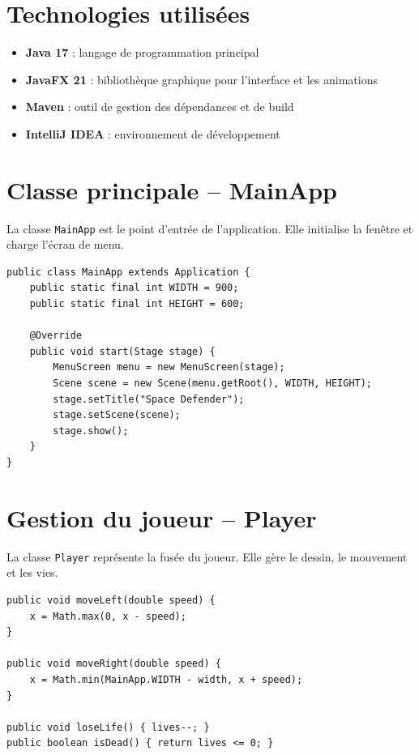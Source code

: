 \documentclass[12pt,a4paper]{report}
\begin{document}
\section{Technologies utilisées}
\begin{itemize}[leftmargin=1.5cm]
  \item \textbf{Java 17} : langage de programmation principal
  \item \textbf{JavaFX 21} : bibliothèque graphique pour l'interface et les animations
  \item \textbf{Maven} : outil de gestion des dépendances et de build
  \item \textbf{IntelliJ IDEA} : environnement de développement
\end{itemize}

\section{Classe principale -- MainApp}
La classe \texttt{MainApp} est le point d'entrée de l'application. Elle initialise la fenêtre et charge l'écran de menu.

\begin{lstlisting}[caption={MainApp.java -- Point d'entrée}]
public class MainApp extends Application {
    public static final int WIDTH = 900;
    public static final int HEIGHT = 600;

    @Override
    public void start(Stage stage) {
        MenuScreen menu = new MenuScreen(stage);
        Scene scene = new Scene(menu.getRoot(), WIDTH, HEIGHT);
        stage.setTitle("Space Defender");
        stage.setScene(scene);
        stage.show();
    }
}
\end{lstlisting}

\section{Gestion du joueur -- Player}
La classe \texttt{Player} représente la fusée du joueur. Elle gère le dessin, le mouvement et les vies.

\begin{lstlisting}[caption={Player.java -- Mouvement et vies}]
public void moveLeft(double speed) {
    x = Math.max(0, x - speed);
}

public void moveRight(double speed) {
    x = Math.min(MainApp.WIDTH - width, x + speed);
}

public void loseLife() { lives--; }
public boolean isDead() { return lives <= 0; }
\end{lstlisting}
\end{document}

